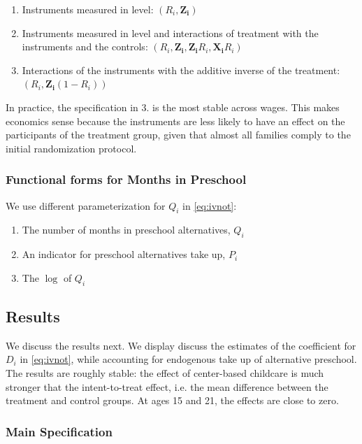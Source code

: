 \begin{appendices}
\begin{enumerate}
\item Instruments measured in level: $ \left( R_i,\mathbf{Z_i} \right) $
\item \label{interact} Instruments measured in level and interactions of treatment with the instruments and the controls: $ \left(R_i,\mathbf{Z_i},\mathbf{Z_i}R_i,\mathbf{X_i}R_i \right)$
\item Interactions of the instruments with the additive inverse of the treatment: $\left( R_i,\mathbf{Z_i} \left( 1-R_i \right) \right)$
\end{enumerate}

\noindent In practice, the specification in 3. is the most stable across wages. This makes economics sense because the instruments are less likely to have an effect on the participants of the treatment group, given that almost all families comply to the initial randomization protocol.

\subsubsection{Functional forms for Months in Preschool}

\noindent We use different parameterization for $Q_{i}$ in \eqref{eq:ivnot}: 

\begin{enumerate}
\item The number of months in preschool alternatives, $Q_{i}$
\item An indicator for preschool alternatives take up, $P_i$
\item The $\log$ of $Q_{i}$
\end{enumerate}

\subsection{Results}

\noindent We discuss the results next. We display discuss the estimates of the coefficient for $D_{i}$ in \eqref{eq:ivnot}, while accounting for endogenous take up of alternative preschool. The results are roughly stable: the effect of center-based childcare is much stronger that the intent-to-treat effect, i.e. the mean difference between the treatment and control groups. At ages 15 and 21, the effects are close to zero.

\subsubsection{Main Specification}


\end{appendices}
